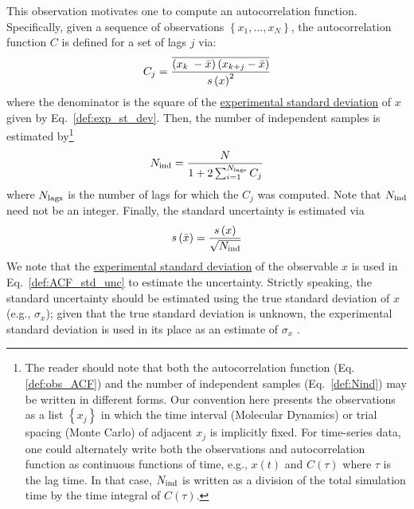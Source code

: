 This observation motivates one to compute an autocorrelation function.  Specifically, given a sequence of observations $\left\{x_1, ..., x_N\right\}$, the autocorrelation function $C$ is defined for a set of lags $j$ via:
%
\begin{equation}
  C_j = \dfrac{
   \overline{
      \left( x_{k{\color{white}j}}\hspace{-1pt} - \mean{x} \right)
      \left( x_{k+j} - \mean{x} \right)
    }
  }
  {\stdev{x}^2}
  \label{def:obs_ACF}
\end{equation}
%
where the denominator is the square of the \hyperref[def:exp_st_dev]{experimental standard deviation} of $x$ given by Eq.~\ref{def:exp_st_dev}.
Then, the number of independent samples is estimated by\footnote{The reader should note that both the autocorrelation function (Eq. \ref{def:obs_ACF}) and the number of independent samples (Eq.~\ref{def:Nind}) may be written in different forms\cite{Grossfield2009,Chodera-2016}. Our convention here presents the observations as a list $\left\{x_j\right\}$ in which the time interval (Molecular Dynamics) or trial spacing (Monte Carlo) of adjacent $x_j$ is implicitly fixed. For time-series data, one could alternately write both the observations and autocorrelation function as continuous functions of time, e.g., $x\left(t\right)$ and $C\left(\tau\right)$ where $\tau$ is the lag time. In that case, $N_{\rm ind}$ is written as a division of the total simulation time by the time integral of $C\left(\tau\right)$\cite{Grossfield2009}.}
%
\begin{equation}
  N_{\rm ind} = \dfrac{N}{1+2 \sum_{i=1}^{N_{\rm lags}} C_j}
  \label{def:Nind}
\end{equation}
%
where $N_{\rm lags}$ is the number of lags for which the $C_j$ was computed.  Note that $N_{\rm ind}$ need not be an integer.
Finally, the standard uncertainty is estimated via
%
\begin{equation}
  s\left( \bar{x} \right) = \dfrac{s\left( x \right)}{\sqrt{N_{\rm ind}}}
  \label{def:ACF_std_unc}
\end{equation}
%
We note that the \hyperref[def:exp_st_dev]{experimental standard deviation} of the observable $x$ is used in Eq.~\ref{def:ACF_std_unc} to estimate the uncertainty. Strictly speaking, the standard uncertainty should be estimated using the true standard deviation of $x$ (e.g., $\sigma_x$); given that the true standard deviation is unknown, the experimental standard deviation is used in its place as an estimate of $\sigma_x$ \cite{PatroneAIAA}.

